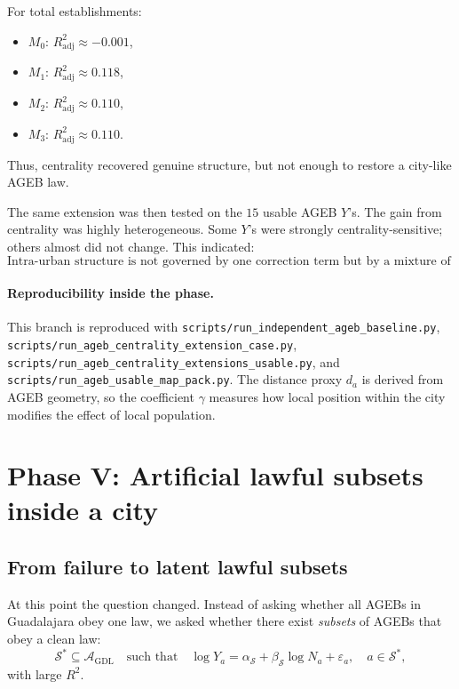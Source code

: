 \documentclass[11pt]{article}
\newcommand{\adjR}{R^2_{\mathrm{adj}}}
\begin{document}
For total establishments:
\begin{itemize}
\item \(M_0\): \(\adjR \approx -0.001\),
\item \(M_1\): \(\adjR \approx 0.118\),
\item \(M_2\): \(\adjR \approx 0.110\),
\item \(M_3\): \(\adjR \approx 0.110\).
\end{itemize}

Thus, centrality recovered genuine structure, but not enough to restore a city-like AGEB law.

The same extension was then tested on the \(15\) usable AGEB \(Y\)'s. The gain from centrality was highly heterogeneous. Some \(Y\)'s were strongly centrality-sensitive; others almost did not change. This indicated:
\begin{equation}
\text{Intra-urban structure is not governed by one correction term but by a mixture of mechanisms.}
\end{equation}

\paragraph{Reproducibility inside the phase.}
This branch is reproduced with
\texttt{scripts/run\_independent\_ageb\_baseline.py},
\texttt{scripts/run\_ageb\_centrality\_extension\_case.py},
\texttt{scripts/run\_ageb\_centrality\_extensions\_usable.py},
and
\texttt{scripts/run\_ageb\_usable\_map\_pack.py}.
The distance proxy \(d_a\) is derived from AGEB geometry, so the coefficient \(\gamma\) measures how local position within the city modifies the effect of local population.

\section{Phase V: Artificial lawful subsets inside a city}

\subsection{From failure to latent lawful subsets}

At this point the question changed. Instead of asking whether all AGEBs in Guadalajara obey one law, we asked whether there exist \emph{subsets} of AGEBs that obey a clean law:
\begin{equation}
\mathcal{S}^\ast \subseteq \mathcal{A}_{\mathrm{GDL}}
\quad\text{such that}\quad
\log Y_a = \alpha_{\mathcal{S}} + \beta_{\mathcal{S}} \log N_a + \varepsilon_a,
\quad
a \in \mathcal{S}^\ast,
\end{equation}
with large \(R^2\).
\end{document}
